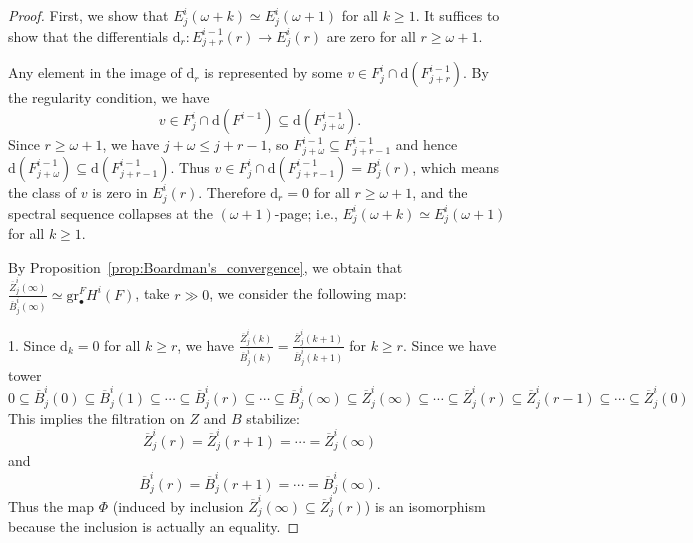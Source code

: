 \begin{proof}
    First, we show that $E^{i}_{j}(\omega+k)\simeq E^{i}_{j}(\omega+1)$ for all $k\ge 1$.
    It suffices to show that the differentials $\mathrm{d}_r: E_{j+r}^{i-1}(r) \to E_j^i(r)$ are zero for all $r \ge \omega+1$.

    Any element in the image of $\mathrm{d}_r$ is represented by some $v \in F_j^i \cap \mathrm{d}(F_{j+r}^{i-1})$.
    By the regularity condition, we have
    $$ v \in F_j^i \cap \mathrm{d}(F^{i-1}) \subseteq \mathrm{d}(F_{j+\omega}^{i-1}). $$
    Since $r \ge \omega+1$, we have $j+\omega \le j+r-1$, so $F_{j+\omega}^{i-1} \subseteq F_{j+r-1}^{i-1}$ and hence $\mathrm{d}(F_{j+\omega}^{i-1}) \subseteq \mathrm{d}(F_{j+r-1}^{i-1})$.
    Thus $v \in F_j^i \cap \mathrm{d}(F_{j+r-1}^{i-1}) = B_j^i(r)$, which means the class of $v$ is zero in $E_j^i(r)$.
    Therefore $\mathrm{d}_r = 0$ for all $r \ge \omega+1$, and the spectral sequence collapses at the $(\omega+1)$-page; i.e., $E^{i}_{j}(\omega+k)\simeq E^{i}_{j}(\omega+1)$ for all $k\ge 1$.

    By Proposition~\ref{prop:Boardman's_convergence}, we obtain that $\frac{\overline{Z}^{i}_{j}(\infty)}{\overline{B}^{i}_{j}(\infty)}\simeq \mathrm{gr}_{\bullet}^{F}H^{i}(F)$, take $r\gg 0$, we consider the following map:

    \begin{center}
    \end{center}

    1. Since $\mathrm{d}_k = 0$ for all $k \ge r$, we have $\frac{\overline{Z}_j^i(k)}{\overline{B}_j^i(k)} = \frac{\overline{Z}_j^i(k+1)}{\overline{B}_j^i(k+1)}$ for $k \ge r$.
    Since we have tower
    \[
        0 \subseteq \overline{B}_j^i(0) \subseteq \overline{B}_j^i(1) \subseteq \cdots \subseteq \overline{B}_j^i(r) \subseteq \cdots \subseteq \overline{B}_j^i(\infty)
        \subseteq \overline{Z}_j^i(\infty) \subseteq \cdots \subseteq \overline{Z}_j^i(r) \subseteq \overline{Z}_j^i(r-1) \subseteq \cdots \subseteq \overline{Z}_j^i(0)
    \]
    This implies the filtration on $Z$ and $B$ stabilize:
    $$ \overline{Z}_j^i(r) = \overline{Z}_j^i(r+1) = \cdots = \overline{Z}_j^i(\infty) $$
    and
    $$ \overline{B}_j^i(r) = \overline{B}_j^i(r+1) = \cdots = \overline{B}_j^i(\infty). $$
    Thus the map $\Phi$ (induced by inclusion $\overline{Z}_j^i(\infty) \subseteq \overline{Z}_j^i(r)$) is an isomorphism because the inclusion is actually an equality.


\end{proof}
